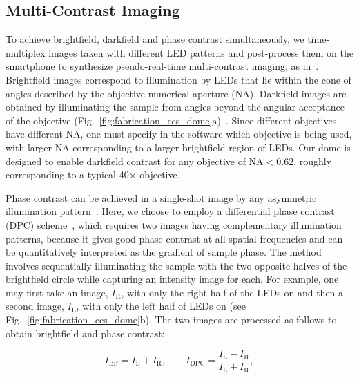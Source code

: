 \subsection{Multi-Contrast Imaging}
To achieve brightfield, darkfield and phase contrast simultaneously, we time-multiplex images taken with different LED patterns and post-process them on the smartphone to synthesize pseudo-real-time multi-contrast imaging, as in~\cite{zijiMulti}. Brightfield images correspond to illumination by LEDs that lie within the cone of angles described by the objective numerical aperture (NA). Darkfield images are obtained by illuminating the sample from angles beyond the angular acceptance of the objective (Fig.~\ref{fig:fabrication_ccs_dome}a)~\cite{Zheng2011}. Since different objectives have different NA, one must specify in the software which objective is being used, with larger NA corresponding to a larger brightfield region of LEDs. Our dome is designed to enable darkfield contrast for any objective of NA$<0.62$, roughly corresponding to a typical 40$\times$ objective.

Phase contrast can be achieved in a single-shot image by any asymmetric illumination pattern~\cite{kachar1985asymmetric,Dodt01101999}. Here, we choose to employ a differential phase contrast (DPC) scheme~\cite{Hamilton1984a,mehta2009quantitative,Tian14,ford2012phase}, which requires two images having complementary illumination patterns, because it gives good phase contrast at all spatial frequencies and can be quantitatively interpreted as the gradient of sample phase. The method involves sequentially illuminating the sample with the two opposite halves of the brightfield circle while capturing an intensity image for each. For example, one may first take an image, $I_\mathrm{R}$, with only the right half of the LEDs on and then a second image, $I_\mathrm{L}$, with only the left half of LEDs on (see Fig.~\ref{fig:fabrication_ccs_dome}b). The two images are processed as follows to obtain brightfield and phase contrast:

\begin{equation}
I_{\mathrm{BF}}=I_\mathrm{L}+I_\mathrm{R}, \qquad I_{\mathrm{DPC}}= \frac{I_\mathrm{L}-I_\mathrm{R}}{I_\mathrm{L}+I_\mathrm{R}},
\label{IBF}
\end{equation}

